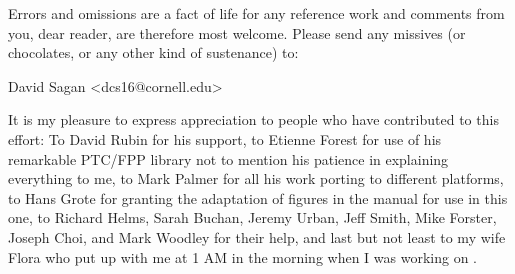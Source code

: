 Errors and omissions are a fact of life for any reference work and
comments from you, dear reader, are therefore most welcome. Please
send any missives (or chocolates, or any other kind of sustenance) to:
\begin{example}
  David Sagan <dcs16@cornell.edu>
\end{example}

It is my pleasure to express appreciation to people who have
contributed to this effort: To David Rubin for his support, to Etienne
Forest for use of his remarkable PTC/FPP library not to mention his
patience in explaining everything to me, to Mark Palmer for all his
work porting \bmad to different platforms, to Hans Grote for granting
the adaptation of figures in the \mad manual for use in this one, to
Richard Helms, Sarah Buchan, Jeremy Urban, Jeff Smith, Mike Forster,
Joseph Choi, and Mark Woodley for their help, and last but not least
to my wife Flora who put up with me at 1 AM in the morning when I was
working on \bmad.

